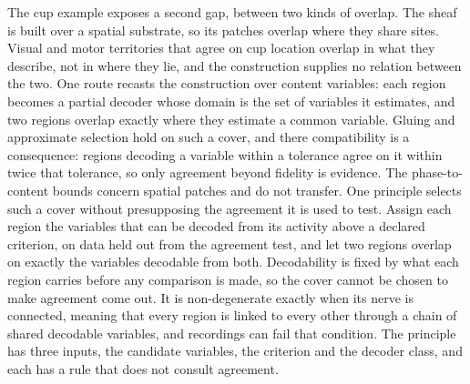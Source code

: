 \documentclass[12pt]{article}
\begin{document}
The cup example exposes a second gap, between two kinds of overlap. The sheaf is built over a spatial substrate, so its patches overlap where they share sites. Visual and motor territories that agree on cup location overlap in what they describe, not in where they lie, and the construction supplies no relation between the two. One route recasts the construction over content variables: each region becomes a partial decoder whose domain is the set of variables it estimates, and two regions overlap exactly where they estimate a common variable. Gluing and approximate selection hold on such a cover, and there compatibility is a consequence: regions decoding a variable within a tolerance agree on it within twice that tolerance, so only agreement beyond fidelity is evidence. The phase-to-content bounds concern spatial patches and do not transfer. One principle selects such a cover without presupposing the agreement it is used to test. Assign each region the variables that can be decoded from its activity above a declared criterion, on data held out from the agreement test, and let two regions overlap on exactly the variables decodable from both. Decodability is fixed by what each region carries before any comparison is made, so the cover cannot be chosen to make agreement come out. It is non-degenerate exactly when its nerve is connected, meaning that every region is linked to every other through a chain of shared decodable variables, and recordings can fail that condition. The principle has three inputs, the candidate variables, the criterion and the decoder class, and each has a rule that does not consult agreement.
\end{document}
